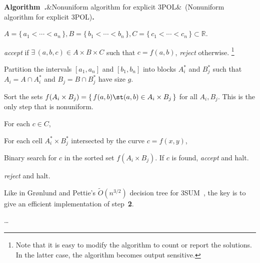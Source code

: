 \documentclass{article}
\newcounter{algorithm}[section]
\begin{document}
%
 \par%
 \vspace{.5\baselineskip\@plus.2\baselineskip\@minus.2\baselineskip}%
\noindent\textbf{Algorithm~.}\ifx&Nonuniform algorithm for explicit 3POL&\else~(Nonuniform algorithm for explicit 3POL)\fi\textbf{.}%
\vspace{0.1cm}%
\begin{adjustwidth}{0.3cm}{0cm}%
\begin{description}%
\setlength{\itemsep}{0pt}%
\setlength{\parskip}{0pt}%
\setlength{\parsep}{0pt}%
\label{algo:ne}
\item[input] $A = \{\,a_1 < \cdots < a_n\,\},B = \{\,b_1<\cdots<b_n\,\},
    C = \{\,c_1<\cdots<c_n\,\}
    \subset \mathbb{R}$.
\item[output] \emph{accept} if $\exists\, (a,b,c) \in A \times B \times C$ such that $c
    = f(a,b)$, \emph{reject} otherwise.%
    \footnote{Note that it is easy to modify the algorithm to count or report the
    solutions. In the latter case, the algorithm becomes output sensitive.}
\item[1.] Partition the intervals $[a_1,a_n]$ and $[b_1,b_n]$ into blocks
    $A_i^*$ and $B_j^*$ such that $A_i = A \cap A_i^*$ and $B_j = B
    \cap B_j^*$ have size $g$.
\item[2.] Sort the sets $f(A_i \times B_j) = \{\, f(a,b) \st (a,b) \in A_i
    \times B_j\,\}$ for all $A_i,B_j$. This is the only step that
    is nonuniform.
\item[3.] For each $c \in C$,
\item[3.1.] For each cell $A_i^* \times B_j^*$ intersected by the curve
$c=f(x,y)$,
\item[3.1.1.] Binary search for $c$ in the sorted set $f(A_i \times B_j)$.
If $c$ is found, \emph{accept} and halt.
\item[4.] \emph{reject} and halt.
%
\end{description}%
\end{adjustwidth}%
\vspace{0.1cm}%
%
%

%
Like in Gr\o nlund and Pettie's $\tilde{O}(n^{3/2})$ decision tree for
3SUM~\cite{GP14}, the key is to give an efficient implementation
of step~\textbf{2}.

\dots
\end{document}
